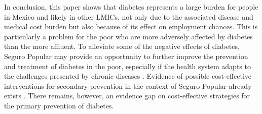 In conclusion, this paper shows that diabetes represents
a large burden for people in Mexico and likely in other \acp{LMIC},
not only due to the associated disease and medical cost burden but
also because of its effect on employment chances. This is particularly
a problem for the poor who are more adversely affected by diabetes
than the more affluent. To alleviate some of the negative effects
of diabetes, Seguro Popular may provide an opportunity to further improve
the prevention and treatment of diabetes in the poor, especially if
the health system adapts to the challenges presented by chronic diseases
\parencite{Samb2010}. Evidence of possible cost-effective interventions
for secondary prevention in the context of Seguro Popular already
exists \parencite{Salomon2012}. There remains, however, an evidence gap
on cost-effective strategies for the primary prevention of diabetes.

\clearpage

